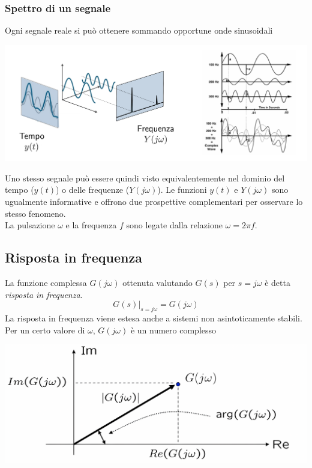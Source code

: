 \documentclass{article}
\numberwithin{equation}{subsection}
\let\oldsubsection\subsection%
\renewcommand{\subsection}{%
  \renewcommand{\theequation}{\thesubsection.\arabic{equation}}%
  \oldsubsection}%
\begin{document}
\subsubsection{Spettro di un segnale}
Ogni segnale reale si può ottenere sommando opportune onde sinusoidali
\begin{center}
    \includegraphics[scale=0.23]{Images/Spettro.png}
\end{center}
Uno stesso segnale può essere quindi visto equivalentemente nel dominio del tempo ($y(t)$) o delle frequenze ($Y(j\omega)$). Le funzioni $y(t)$ e $Y(j\omega)$ sono ugualmente informative e offrono due prospettive complementari per osservare lo stesso fenomeno.
\vspace*{0.1cm}\\
La pulsazione $\omega$ e la frequenza $f$ sono legate dalla relazione $\omega = 2\pi f$.





\subsection{Risposta in frequenza}
La funzione complessa $G(j\omega)$ ottenuta valutando $G(s)$ per $s = j \omega$ è detta \textit{risposta in frequenza}.
\begin{equation}
    G(s) \bigg|_{s=j\omega} = G(j\omega)
\end{equation}
La risposta in frequenza viene estesa anche a sistemi non asintoticamente stabili.
\vspace*{0.1cm}\\
Per un certo valore di $\omega$, $G(j\omega)$ è un numero complesso
\begin{center}
    \includegraphics[scale=0.12]{Images/Risposta_in_frequenza_1.png}
\end{center}
\end{document}
